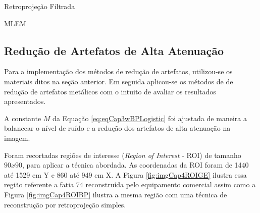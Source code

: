 \begin{algorithm}[H]
	\label{alg:algRetroprojecaoFiltrada}
	\caption{Retroprojeção Filtrada}
\end{algorithm}

\begin{algorithm}[H]
	\label{alg:algMlEM}
	\caption{MLEM}
\end{algorithm}


\subsection{Redução de Artefatos de Alta Atenuação}\label{MetodosReduçãodeArtefatosdeAltaAtenuação} 

Para a implementação dos métodos de redução de artefatos, utilizou-se os materiais ditos na seção anterior. Em seguida aplicou-se os métodos de  de redução de artefatos metálicos com o intuito de avaliar os resultados apresentados. 

A constante $M$ da Equação \ref{eq:eqCap3wBPLogistic} foi ajustada de maneira a balancear o nível de ruído e a redução dos artefatos de alta atenuação na imagem.


Foram recortadas regiões de interesse (\textit{Region of Interest} - \acs{ROI}) de tamanho $90x90$, para aplicar a técnica abordada. As coordenadas da \acs{ROI} foram de 1440 até 1529 em Y e 860 até 949 em X. A Figura \ref{fig:imgCap4ROIGE} ilustra essa região referente a fatia 74 reconstruída pelo equipamento comercial assim como a Figura \ref{fig:imgCap4ROIBP} ilustra a mesma região com uma técnica de reconstrução por retroprojeção simples. 

